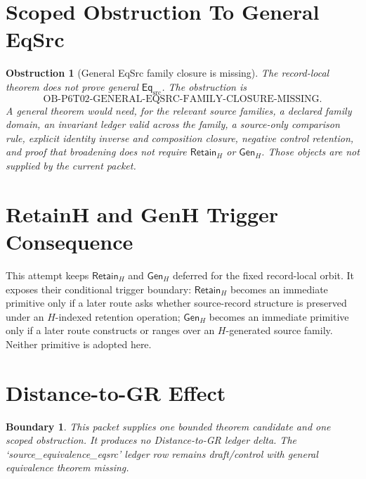 \documentclass[11pt]{article}
\newcommand{\EqSrc}{\mathsf{Eq}_{\mathrm{src}}}
\newcommand{\RetainH}{\mathsf{Retain}_{H}}
\newcommand{\GenH}{\mathsf{Gen}_{H}}
\newtheorem{obstruction}{Obstruction}
\newtheorem{boundary}{Boundary}
\begin{document}
\section{Scoped Obstruction To General EqSrc}

\begin{obstruction}[General EqSrc family closure is missing]
The record-local theorem does not prove general \(\EqSrc\). The obstruction
is
\[
  \mathrm{OB\mbox{-}P6T02\mbox{-}GENERAL\mbox{-}EQSRC\mbox{-}FAMILY\mbox{-}CLOSURE\mbox{-}MISSING}.
\]
A general theorem would need, for the relevant source families, a declared
family domain, an invariant ledger valid across the family, a source-only
comparison rule, explicit identity inverse and composition closure, negative
control retention, and proof that broadening does not require \(\RetainH\)
or \(\GenH\). Those objects are not supplied by the current packet.
\end{obstruction}

\section{RetainH and GenH Trigger Consequence}

This attempt keeps \(\RetainH\) and \(\GenH\) deferred for the fixed
record-local orbit. It exposes their conditional trigger boundary:
\(\RetainH\) becomes an immediate primitive only if a later route asks
whether source-record structure is preserved under an \(H\)-indexed retention
operation; \(\GenH\) becomes an immediate primitive only if a later route
constructs or ranges over an \(H\)-generated source family. Neither primitive
is adopted here.

\section{Distance-to-GR Effect}

\begin{boundary}
This packet supplies one bounded theorem candidate and one scoped obstruction.
It produces no Distance-to-GR ledger delta. The `source_equivalence_eqsrc'
ledger row remains draft/control with general equivalence theorem missing.
\end{boundary}
\end{document}
